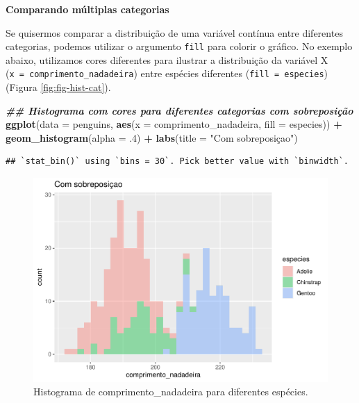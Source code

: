 \documentclass[
]{article}
\newenvironment{Shaded}{\begin{snugshade}}{\end{snugshade}}
\newcommand{\AttributeTok}[1]{\textcolor[rgb]{0.13,0.29,0.53}{#1}}
\newcommand{\DecValTok}[1]{\textcolor[rgb]{0.00,0.00,0.81}{#1}}
\newcommand{\DocumentationTok}[1]{\textcolor[rgb]{0.56,0.35,0.01}{\textbf{\textit{#1}}}}
\newcommand{\FunctionTok}[1]{\textcolor[rgb]{0.13,0.29,0.53}{\textbf{#1}}}
\newcommand{\NormalTok}[1]{#1}
\newcommand{\SpecialCharTok}[1]{\textcolor[rgb]{0.81,0.36,0.00}{\textbf{#1}}}
\newcommand{\StringTok}[1]{\textcolor[rgb]{0.31,0.60,0.02}{#1}}
\begin{document}
\textbf{Comparando múltiplas categorias}

Se quisermos comparar a distribuição de uma variável contínua entre diferentes categorias, podemos utilizar o argumento \texttt{fill} para colorir o gráfico. No exemplo abaixo, utilizamos cores diferentes para ilustrar a distribuição da variável X (\texttt{x\ =\ comprimento\_nadadeira}) entre espécies diferentes (\texttt{fill\ =\ especies}) (Figura \ref{fig:fig-hist-cat}).

\begin{Shaded}
\begin{Highlighting}[]
\DocumentationTok{\#\# Histograma com cores para diferentes categorias com sobreposição}
\FunctionTok{ggplot}\NormalTok{(}\AttributeTok{data =}\NormalTok{ penguins, }
       \FunctionTok{aes}\NormalTok{(}\AttributeTok{x =}\NormalTok{ comprimento\_nadadeira, }\AttributeTok{fill =}\NormalTok{ especies)) }\SpecialCharTok{+}
    \FunctionTok{geom\_histogram}\NormalTok{(}\AttributeTok{alpha =}\NormalTok{ .}\DecValTok{4}\NormalTok{) }\SpecialCharTok{+}
    \FunctionTok{labs}\NormalTok{(}\AttributeTok{title =} \StringTok{"Com sobreposiçao"}\NormalTok{)}
\end{Highlighting}
\end{Shaded}

\begin{verbatim}
## `stat_bin()` using `bins = 30`. Pick better value with `binwidth`.
\end{verbatim}

\begin{figure}
\centering
\includegraphics{epr_files/figure-latex/fig-hist-cat-1.pdf}
\caption{\label{fig:fig-hist-cat-1}Histograma de comprimento\_nadadeira para diferentes espécies.}
\end{figure}
\end{document}
